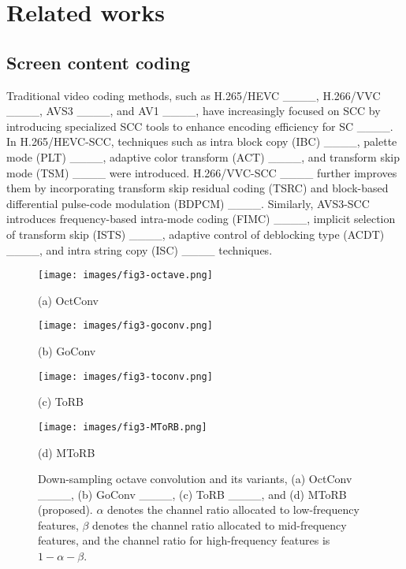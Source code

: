 \section{Related works}
\subsection{Screen content coding}
Traditional video coding methods, such as H.265/HEVC ____, H.266/VVC ____, AVS3 ____, and AV1 ____, have increasingly focused on SCC by introducing specialized SCC tools to enhance encoding efficiency for SC ____. In H.265/HEVC-SCC, techniques such as intra block copy (IBC) ____, palette mode (PLT) ____, adaptive color transform (ACT) ____, and transform skip mode (TSM) ____ were introduced. H.266/VVC-SCC ____ further improves them by incorporating transform skip residual coding (TSRC) and block-based differential pulse-code modulation (BDPCM) ____. Similarly, AVS3-SCC introduces frequency-based intra-mode coding (FIMC) ____, implicit selection of transform skip (ISTS) ____, adaptive control of deblocking type (ACDT) ____, and intra string copy (ISC) ____ techniques.
\begin{figure}[t]
\centering
\begin{minipage}[b]{0.48\linewidth}
  \centering
  \texttt{[image: images/fig3-octave.png]}
  \centerline{(a) OctConv}\medskip
\end{minipage}
\begin{minipage}[b]{0.48\linewidth}
  \centering
  \texttt{[image: images/fig3-goconv.png]}
  \centerline{(b) GoConv}\medskip
\end{minipage}
\begin{minipage}[b]{\linewidth}
  \centering
  \texttt{[image: images/fig3-toconv.png]}
  \centerline{(c) ToRB}\medskip
\end{minipage}
\begin{minipage}[b]{\linewidth}
  \centering
  \texttt{[image: images/fig3-MToRB.png]}
  \centerline{(d) MToRB}\medskip
\end{minipage}
\caption{Down-sampling octave convolution and its variants, (a) OctConv ____, (b) GoConv ____, (c) ToRB ____, and (d) MToRB (proposed). \({\alpha}\) denotes the channel ratio allocated to low-frequency features, \({\beta}\) denotes the channel ratio allocated to mid-frequency features, and the channel ratio for high-frequency features is \(1 - {\alpha} - {\beta}\).}
\label{fig:octave methods}
\end{figure}

